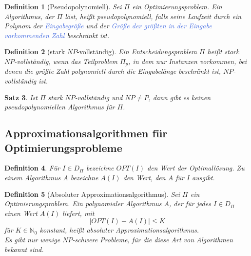 \documentclass[11pt]{article}
\newcommand{\tcol}[1]{\textcolor{RoyalBlue}{#1}}
\theoremstyle{break}
\newtheorem{satz}{Satz}[section]
\newtheorem{defi}[satz]{Definition}
\begin{document}
    \begin{defi}[Pseudopolynomiell]
        Sei $\Pi$ ein Optimierungsproblem.
        Ein Algorithmus, der $\Pi$ löst, heißt pseudopolynomiell, falls seine Laufzeit durch ein Polynom der \tcol{Eingabegröße} und der \tcol{Größe der größten in der Eingabe vorkommenden Zahl} beschränkt ist.
    \end{defi}

    \begin{defi}[stark $NP$-vollständig]
        Ein Entscheidungsproblem $\Pi$ heißt stark $NP$-vollständig, wenn das Teilproblem $\Pi_p$, in dem nur Instanzen vorkommen, bei denen die größte Zahl polynomiell durch die Eingabelänge beschränkt ist, $NP$-vollständig ist.
    \end{defi}

    \begin{satz}
        Ist $\Pi$ stark $NP$-vollständig und $NP\neq P$, dann gibt es keinen pseudopolynomiellen Algorithmus für $\Pi$.
    \end{satz}


    \subsection{Approximationsalgorithmen
	 für Optimierungsprobleme}\label{subsec:approximationsalgorithmenindexfür-optimierungsprobleme}

    \begin{defi}
        Für $I\in D_\Pi$ bezeichne $OPT(I)$ den Wert der Optimallösung.
        Zu einem Algorithmus $A$ bezeichne $A(I)$ den Wert, den $A$ für $I$ ausgibt.
    \end{defi}

    \begin{defi}[Absoluter Approximationsalgorithmus]
        Sei $\Pi$ ein Optimierungsproblem.
        Ein polynomialer Algorithmus $A$, der für jedes $I\in D_\Pi$ einen Wert $A(I)$ liefert, mit
        \[|OPT(I)-A(I)|\leq K\]
        für $K\in\mathbb{N}_0$ konstant, heißt absoluter Approximationsalgorithmus.\\
        Es gibt nur wenige $NP$-schwere Probleme, für die diese Art von Algorithmen bekannt sind.
    \end{defi}
\end{document}
